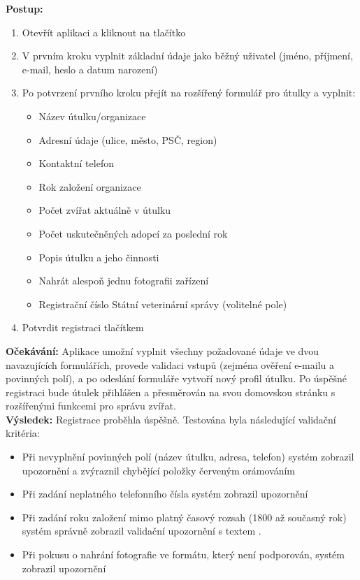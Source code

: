 \documentclass[czech, bp, kiv, he, iso690numb, pdf]{fasthesis}
\begin{document}
    \noindent \textbf{Postup:}
    \begin{enumerate}
        \item Otevřít aplikaci a kliknout na tlačítko 
        \item V prvním kroku vyplnit základní údaje jako běžný uživatel (jméno, příjmení, e-mail, heslo a datum narození)
        \item Po potvrzení prvního kroku přejít na rozšířený formulář pro útulky a vyplnit:
        \begin{itemize}
            \item Název útulku/organizace
            \item Adresní údaje (ulice, město, PSČ, region)
            \item Kontaktní telefon
            \item Rok založení organizace
            \item Počet zvířat aktuálně v útulku
            \item Počet uskutečněných adopcí za poslední rok
            \item Popis útulku a jeho činnosti
            \item Nahrát alespoň jednu fotografii zařízení
            \item Registrační číslo Státní veterinární správy (volitelné pole)
        \end{itemize}
        \item Potvrdit registraci tlačítkem 
    \end{enumerate}

    \noindent \textbf{Očekávání:} Aplikace umožní vyplnit všechny požadované údaje ve dvou navazujících formulářích, provede validaci vstupů (zejména ověření e-mailu a povinných polí), a po odeslání formuláře vytvoří nový profil útulku. Po úspěšné registraci bude útulek přihlášen a přesměrován na svou domovskou stránku s rozšířenými funkcemi pro správu zvířat.\\

    \noindent \textbf{Výsledek:}
    Registrace proběhla úspěšně. Testována byla následující validační kritéria:
    \begin{itemize}
        \item Při nevyplnění povinných polí (název útulku, adresa, telefon) systém zobrazil upozornění  a zvýraznil chybějící položky červeným orámováním
        \item Při zadání neplatného telefonního čísla systém zobrazil upozornění 
        \item Při zadání roku založení mimo platný časový rozsah (1800 až současný rok) systém správně zobrazil validační upozornění s textem .
        \item Při pokusu o nahrání fotografie ve formátu, který není podporován, systém zobrazil upozornění 
    \end{itemize}
\end{document}
